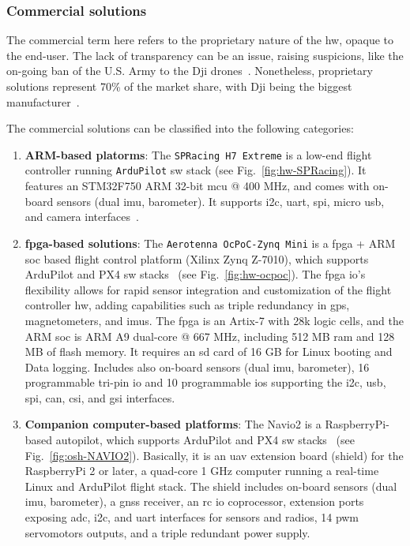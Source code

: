 \subsubsection{Commercial solutions}%
\label{sec:commercial-solutions-hw}
The commercial term here refers to the proprietary nature of the \gls{hw},
opaque to the end-user. The
lack of transparency can be an issue, raising suspicions, like the on-going ban
of the U.S. Army to the Dji
drones~\cite{suasNewsDjiDronesBanned2017,djiBan2022}. Nonetheless, proprietary
solutions represent 70\% of the market share, with Dji being the biggest
manufacturer~\cite{droneAnalyst2021}.

The commercial solutions can be classified into the following categories:
\begin{enumerate}
\item \textbf{ARM-based platorms}: The \texttt{SPRacing H7 Extreme} is a low-end
  flight controller running \texttt{ArduPilot} \gls{sw} stack (see Fig.~\ref{fig:hw-SPRacing}). It features 
  an STM32F750 ARM 32-bit \gls{mcu} @ 400 MHz, and comes with on-board sensors
  (dual \gls{imu}, barometer). It supports \gls{i2c}, \gls{uart}, \gls{spi},
  micro \gls{usb}, and camera interfaces~\cite{arduPilot-SPRacing}.
%  
\item \textbf{\gls{fpga}-based solutions}:
  The \texttt{Aerotenna OcPoC-Zynq Mini} is a \gls{fpga} + ARM \gls{soc} based
  flight control platform (Xilinx Zynq Z-7010),  which supports ArduPilot and PX4 \gls{sw}
  stacks~\cite{ocpoc} (see Fig.~\ref{fig:hw-ocpoc}).
  The \gls{fpga} \gls{io}'s flexibility allows for rapid sensor integration and
  customization of the flight controller \gls{hw}, adding capabilities
  such as triple redundancy in \gls{gps}, magnetometers, and \glspl{imu}.
  The \gls{fpga} is an Artix-7 with 28k logic cells, and the ARM \gls{soc} is
  ARM A9 dual-core @ 667 MHz, including 512 MB \gls{ram} and 128 MB of flash
  memory. It requires an \gls{sd} card of 16 GB for Linux booting and Data
  logging.
  Includes also on-board
  sensors (dual \gls{imu}, barometer), 16 programmable tri-pin \gls{io} and 
  10 programmable \glspl{io} supporting the \gls{i2c}, \gls{usb}, \gls{spi},
  \gls{can}, \gls{csi}, and \gls{gsi} interfaces.
%  
\item \textbf{Companion computer-based platforms}: The Navio2 is a RaspberryPi-based
  autopilot, which supports ArduPilot and PX4 \gls{sw}
  stacks~\cite{arduPilot-Navio2} (see Fig.~\ref{fig:osh-NAVIO2}). Basically, it is an \gls{uav} extension board
  (shield) for the RaspberryPi 2 or later, a quad-core 1 GHz computer running a
  real-time Linux and ArduPilot flight stack. The shield includes on-board
  sensors (dual \gls{imu}, barometer), a \gls{gnss} receiver, an \gls{rc}
  \gls{io} coprocessor, extension ports exposing \gls{adc}, \gls{i2c}, and
  \gls{uart} interfaces for sensors and radios, 14 \gls{pwm} servomotors
  outputs, and a triple redundant power supply.


\end{enumerate}
